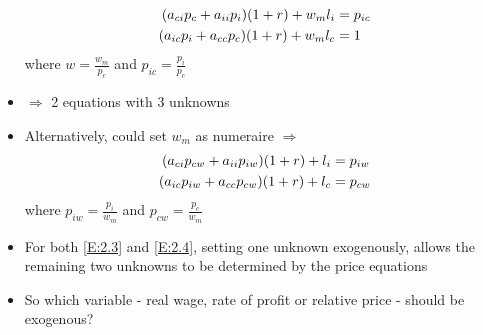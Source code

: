 \documentclass[a4paper,twoside]{article}
\numberwithin{equation}{section}
\numberwithin{figure}{section}
\begin{document}
\begin{itemize}
		\begin{align}
			(a_{ci} p_c + a_{ii} p_i) (1 + r) + w_m l_i &= p_{ic} \notag \\
			(a_{ic} p_i + a_{cc} p_c) (1 + r) + w_m l_c &= 1 \label{E:2.3}
		\end{align}
		where \( w = \frac{w_m}{p_c} \) and \( p_{ic} = \frac{p_i}{p_c} \)
		\item \( \Rightarrow \) 2 equations with 3 unknowns
		\item Alternatively, could set \( w_m \) as numeraire \( \Rightarrow \) 
		\begin{align}
			(a_{ci} p_{cw} + a_{ii} p_{iw}) (1 + r) + l_i &= p_{iw} \notag \\
			(a_{ic} p_{iw} + a_{cc} p_{cw}) (1 + r) + l_c &= p_{cw} \label{E:2.4}
		\end{align}
		where \( p_{iw} = \frac{p_i}{w_m} \) and \( p_{cw} = \frac{p_c}{w_m} \)
		\item For both \cref{E:2.3} and \cref{E:2.4}, setting one unknown exogenously, allows the remaining two unknowns to be determined by the price equations
		\item So which variable - real wage, rate of profit or relative price - should be exogenous? 
	\end{itemize}
\end{document}
